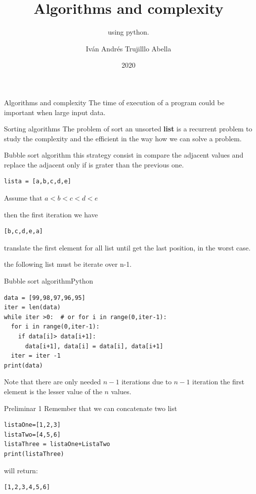 \documentclass{beamer}
\institute{Javeriana}
\date{2020}
\title[Pontificia Universidad Javeriana] %
{Algorithms and complexity \textbf{}}
\subtitle{using python.}
\author[Iván Andrés Trujillo Abella] 
{Iván Andrés Trujilllo Abella}
\institute[] 
{
  Facultad de Ingenieria\\
  Pontificia Universidad Javeriana
  \and
  
\textbf{ trujilloiv@javeriana.edu.co}
}
\date[MINTA] %
\begin{document}
\frame{\titlepage}

\begin{frame}{Algorithms and complexity}
The time of execution of a program could be important when large input data.
\end{frame}

\begin{frame}[fragile]{Sorting algorithms}
The problem of sort an unsorted \textbf{list} is a recurrent problem to study the complexity and the efficient in the way how we can solve a problem.
\end{frame}

\begin{frame}[fragile]{Bubble sort algorithm}
this strategy consist in compare the adjacent values and replace the adjacent only if is grater than the previous one.


\begin{lstlisting}
lista = [a,b,c,d,e]
\end{lstlisting}
Assume that  $ a < b < c < d <e$ 

then the first iteration we have 
\begin{verbatim}
[b,c,d,e,a]
\end{verbatim}
translate the first  element for all list until get the last position, in the worst case.

the following list must be iterate over n-1. 

\end{frame}

\begin{frame}[fragile]{Bubble sort algorithm}{Python}
\begin{lstlisting}
data = [99,98,97,96,95]
iter = len(data)
while iter >0:  # or for i in range(0,iter-1):
  for i in range(0,iter-1):
    if data[i]> data[i+1]:
      data[i+1], data[i] = data[i], data[i+1]
  iter = iter -1 
print(data)
\end{lstlisting}
Note that there are only needed $n-1$ iterations due to $n-1$ iteration the first element is the lesser value of the $n$ values.
\end{frame}


\begin{frame}[fragile]{Preliminar 1}
Remember that we can concatenate two list 
\begin{lstlisting}
listaOne=[1,2,3]
listaTwo=[4,5,6]
listaThree = listaOne+ListaTwo
print(listaThree)
\end{lstlisting}
will return:
\begin{verbatim}
[1,2,3,4,5,6]
\end{verbatim}
\end{frame}
\end{document}
